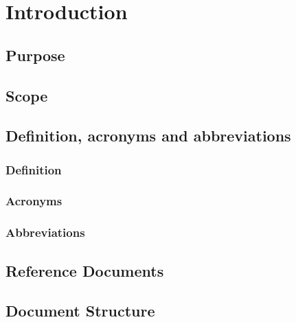 \section{Introduction}
\subsection{Purpose}
\subsection{Scope}
\subsection{Definition, acronyms and abbreviations}
	\subsubsection{Definition}
	\subsubsection{Acronyms}
	\subsubsection{Abbreviations}
\subsection{Reference Documents}
\subsection{Document Structure}